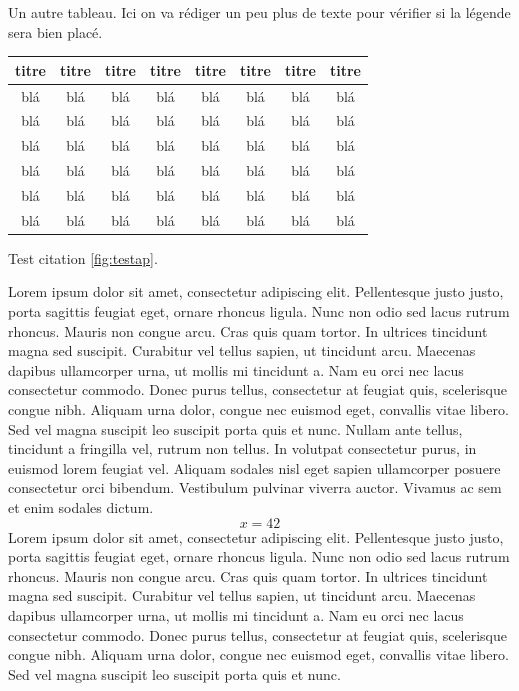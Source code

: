 \documentclass[letterpaper, twoside, 12pt,these,creativecommons,hyperref]{thETS}
\begin{document}
\begin{tableap}[*ht]
	\caption{Un autre tableau. Ici on va rédiger un peu plus de texte pour vérifier si la légende sera bien placé.}
		\begin{tabular}{|c|c|c|c|c|c|c|c|}
		\hline
			{\bf titre} & {\bf titre} & {\bf titre} & {\bf titre} & {\bf titre} & {\bf titre} & {\bf titre} & {\bf titre} \\
	  \hline
			blá & blá & blá & blá & blá & blá & blá & blá \\
	  \hline
			blá & blá & blá & blá & blá & blá & blá & blá \\
	  \hline
			blá & blá & blá & blá & blá & blá & blá & blá \\
	  \hline
			blá & blá & blá & blá & blá & blá & blá & blá \\
	  \hline
			blá & blá & blá & blá & blá & blá & blá & blá \\
	  \hline
			blá & blá & blá & blá & blá & blá & blá & blá \\
	  \hline
		\end{tabular}
	\label{tab:tableau_annexe}
\end{tableap}

Test citation \ref{fig:testap}.

Lorem ipsum dolor sit amet, consectetur adipiscing elit. Pellentesque justo justo, porta sagittis feugiat eget, ornare rhoncus ligula. Nunc non odio sed lacus rutrum rhoncus. Mauris non congue arcu. Cras quis quam tortor. In ultrices tincidunt magna sed suscipit. Curabitur vel tellus sapien, ut tincidunt arcu. Maecenas dapibus ullamcorper urna, ut mollis mi tincidunt a. Nam eu orci nec lacus consectetur commodo. Donec purus tellus, consectetur at feugiat quis, scelerisque congue nibh. Aliquam urna dolor, congue nec euismod eget, convallis vitae libero. Sed vel magna suscipit leo suscipit porta quis et nunc. Nullam ante tellus, tincidunt a fringilla vel, rutrum non tellus. In volutpat consectetur purus, in euismod lorem feugiat vel. Aliquam sodales nisl eget sapien ullamcorper posuere consectetur orci bibendum. Vestibulum pulvinar viverra auctor. Vivamus ac sem et enim sodales dictum.
\begin{equation}
x = 42
\end{equation} 
Lorem ipsum dolor sit amet, consectetur adipiscing elit. Pellentesque justo justo, porta sagittis feugiat eget, ornare rhoncus ligula. Nunc non odio sed lacus rutrum rhoncus. Mauris non congue arcu. Cras quis quam tortor. In ultrices tincidunt magna sed suscipit. Curabitur vel tellus sapien, ut tincidunt arcu. Maecenas dapibus ullamcorper urna, ut mollis mi tincidunt a. Nam eu orci nec lacus consectetur commodo. Donec purus tellus, consectetur at feugiat quis, scelerisque congue nibh. Aliquam urna dolor, congue nec euismod eget, convallis vitae libero. Sed vel magna suscipit leo suscipit porta quis et nunc.
\end{document}
